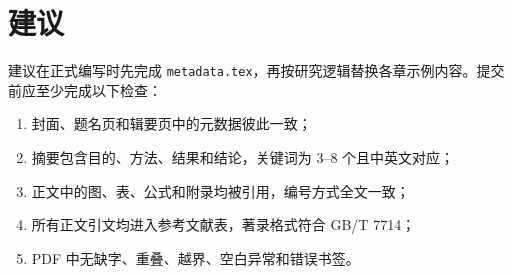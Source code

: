 \chapter{建议}

建议在正式编写时先完成 \texttt{metadata.tex}，再按研究逻辑替换各章示例内容。提交前应至少完成以下检查：

\begin{enumerate}[label=\arabic*)]
  \item 封面、题名页和辑要页中的元数据彼此一致；
  \item 摘要包含目的、方法、结果和结论，关键词为 3--8 个且中英文对应；
  \item 正文中的图、表、公式和附录均被引用，编号方式全文一致；
  \item 所有正文引文均进入参考文献表，著录格式符合 GB/T 7714\cite{gbt7714_2015}；
  \item PDF 中无缺字、重叠、越界、空白异常和错误书签。
\end{enumerate}
